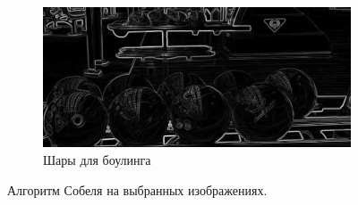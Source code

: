 \documentclass[a4paper, 16pt]{article}
\begin{document}
\begin{figure}[htbp]
        \hfill
        \begin{subfigure}{0.3\textwidth}
            \centering
            \includegraphics[width=\linewidth]{canny_ci3.png}
            \caption{Шары для боулинга}
            \label{fig:canny_ci3}
        \end{subfigure}
        \caption{Алгоритм Собеля на выбранных изображениях.}
        \label{fig:canny_cis}
    \end{figure}
\end{document}
